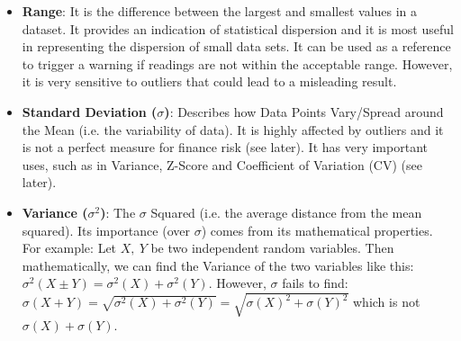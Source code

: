 \documentclass[11pt, twocolumn]{article}
\begin{document}
\begin{itemize}
\item \textbf{Range}: It is the difference between the largest and smallest values in a dataset. It provides an indication of statistical dispersion and it is most useful in representing the dispersion of small data sets. It can be used as a reference to trigger a warning if readings are not within the acceptable range. However, it is very sensitive to outliers that could lead to a misleading result.
\end{itemize}

\begin{itemize}
\item \textbf{Standard Deviation ($\sigma$)}: Describes how Data Points Vary/Spread around the Mean (i.e. the variability of data). It is highly affected by outliers and it is not a perfect measure for finance risk (see later). It has very important uses, such as in Variance, Z-Score and Coefficient of Variation (CV) (see later).
\end{itemize}

\begin{itemize}
\item \textbf{Variance ($\sigma^2$)}: The $\sigma$ Squared (i.e. the average distance from the mean squared). Its importance (over $\sigma$) comes from its {\color{blue} mathematical properties}. For example: Let $X, ~ Y$ be two independent random variables. Then mathematically, we can find the Variance of the two variables like this: $\sigma^2(X \pm Y) = \sigma^2(X) + \sigma^2(Y)$. However, $\sigma$ fails to find: $\sigma(X + Y) = \sqrt{\sigma^2(X) + \sigma^2(Y)} = \sqrt{\sigma(X)^2 + \sigma(Y)^2}$ which is not $\sigma(X) + \sigma(Y)$.
\end{itemize}
\end{document}
